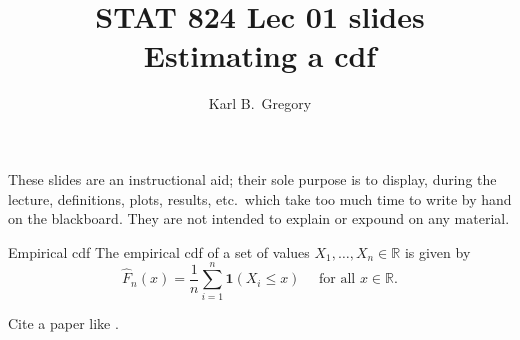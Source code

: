 \documentclass[10pt]{beamer}
\author{Karl B.~Gregory}
\institute[U.~of South Carolina]{University of South Carolina}
\title[STAT 824 \semester Lec 01 slides]{STAT 824 \semester Lec 01 slides\\
\vspace{12pt} 
Estimating a cdf}
\date{}
\newcommand{\disclaimer}{These slides are an instructional aid; their sole purpose is to display, during the lecture, definitions, plots, results, etc.~which take too much time to write by hand on the blackboard.  They are not intended to explain or expound on any material.}
\begin{document}
\begin{frame}
\maketitle

\begin{center}\footnotesize
\disclaimer
\end{center}
\end{frame}



\begin{frame}
    
\begin{block}{Empirical cdf}
The empirical cdf of a set of values $X_1,\dots,X_n \in \mathbb{R}$ is given by
\[
\hat F_n(x) = \frac{1}{n}\sum_{i=1}^n\mathbf{1}(X_i \leq x) \quad \text{ for all } x \in \mathbb{R}.
\]
\end{block}

\vspace{12pt}

Cite a paper like \cite{tsybakov2008introduction}.
    
\end{frame}


\begin{frame}


    
\end{frame}
\end{document}
